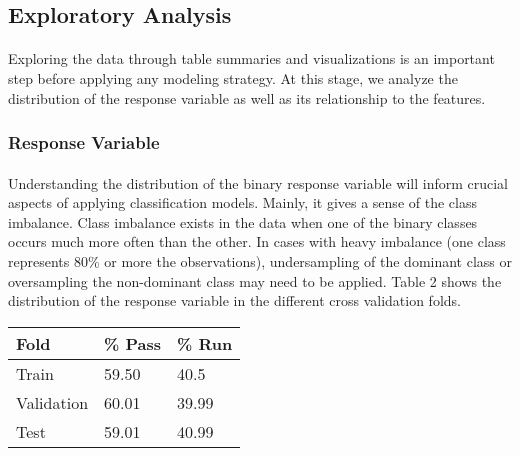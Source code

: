 \documentclass[11pt]{article}
\begin{document}
\begin{multicols*}{2}
        \subsection{Exploratory Analysis}
            \paragraph{}
                Exploring the data through table summaries and visualizations is an important step before applying any modeling strategy.
                At this stage, we analyze the distribution of the response variable as well as its relationship to the features.

            \vspace{-5pt}

            \subsubsection*{Response Variable}
                \paragraph{}
                    Understanding the distribution of the binary response variable will inform crucial aspects of applying classification models.
                    Mainly, it gives a sense of the class imbalance. 
                    Class imbalance exists in the data when one of the binary classes occurs much more often than the other. 
                    In cases with heavy imbalance (one class represents 80\% or more the observations), undersampling of the dominant class or oversampling the non-dominant class may need to be applied.
                    Table 2 shows the distribution of the response variable in the different cross validation folds.  
                
                \vspace{15pt}
                
                \begin{tabular}{|| m{2cm} | m{2cm}| m{2cm} ||}
                    \hline
                    \textbf{Fold} & \textbf{\% Pass} & \textbf{\% Run}  \\
                    \hline\hline
                    Train  & 59.50 & 40.5 \\
                    \hline
                    Validation & 60.01 & 39.99 \\
                    \hline
                    Test & 59.01 & 40.99 \\
                    \hline
                \end{tabular}
                

\end{multicols*}
\end{document}
